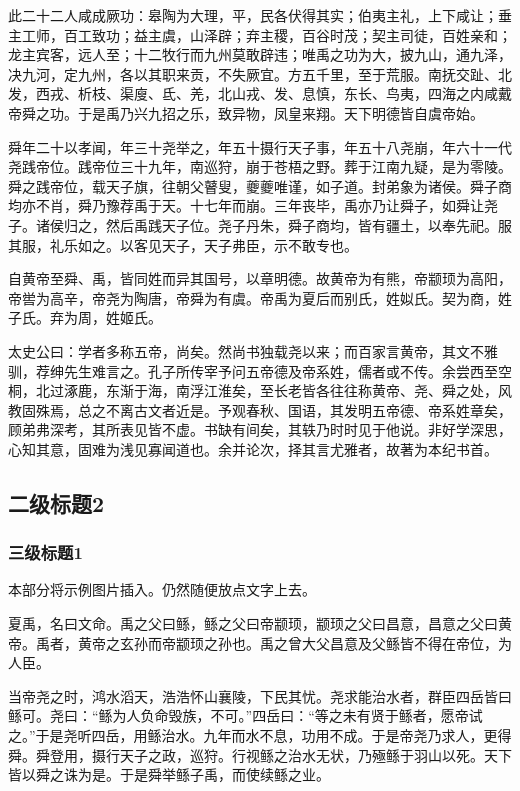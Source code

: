 \documentclass[UTF8,12pt,AutoFakeBold,fontset=fandol]{ctexart}
\begin{document}
	此二十二人咸成厥功：皋陶为大理，平，民各伏得其实；伯夷主礼，上下咸让；垂主工师，百工致功；益主虞，山泽辟；弃主稷，百谷时茂；契主司徒，百姓亲和；龙主宾客，远人至；十二牧行而九州莫敢辟违；唯禹之功为大，披九山，通九泽，决九河，定九州，各以其职来贡，不失厥宜。方五千里，至于荒服。南抚交趾、北发，西戎、析枝、渠廋、氐、羌，北山戎、发、息慎，东长、鸟夷，四海之内咸戴帝舜之功。于是禹乃兴九招之乐，致异物，凤皇来翔。天下明德皆自虞帝始。
	\par
	舜年二十以孝闻，年三十尧举之，年五十摄行天子事，年五十八尧崩，年六十一代尧践帝位。践帝位三十九年，南巡狩，崩于苍梧之野。葬于江南九疑，是为零陵。舜之践帝位，载天子旗，往朝父瞽叟，夔夔唯谨，如子道。封弟象为诸侯。舜子商均亦不肖，舜乃豫荐禹于天。十七年而崩。三年丧毕，禹亦乃让舜子，如舜让尧子。诸侯归之，然后禹践天子位。尧子丹朱，舜子商均，皆有疆土，以奉先祀。服其服，礼乐如之\cite{PhysRevLett.43.1365}。以客见天子，天子弗臣，示不敢专也。
	\par
	自黄帝至舜、禹，皆同姓而异其国号，以章明德。故黄帝为有熊，帝颛顼为高阳，帝喾为高辛，帝尧为陶唐，帝舜为有虞。帝禹为夏后而别氏，姓姒氏。契为商，姓子氏。弃为周，姓姬氏。
	\par
	太史公曰：学者多称五帝，尚矣。然尚书独载尧以来；而百家言黄帝，其文不雅驯，荐绅先生难言之。孔子所传宰予问五帝德及帝系姓，儒者或不传。余尝西至空桐，北过涿鹿，东渐于海，南浮江淮矣，至长老皆各往往称黄帝、尧、舜之处，风教固殊焉，总之不离古文者近是。予观春秋、国语，其发明五帝德、帝系姓章矣，顾弟弗深考，其所表见皆不虚。书缺有间矣，其轶乃时时见于他说。非好学深思，心知其意，固难为浅见寡闻道也。余并论次，择其言尤雅者，故著为本纪书首。
	
	
	
	
	
	\subsection{二级标题2\label{章节：二级标题2}}
	
	\subsubsection{三级标题1\label{章节：三级标题1}}
	
	本部分将示例图片插入。仍然随便放点文字上去。
	
	夏禹，名曰文命。禹之父曰鲧，鲧之父曰帝颛顼，颛顼之父曰昌意，昌意之父曰黄帝。禹者，黄帝之玄孙而帝颛顼之孙也。禹之曾大父昌意及父鲧皆不得在帝位，为人臣。
	
	当帝尧之时，鸿水滔天，浩浩怀山襄陵，下民其忧。尧求能治水者，群臣四岳皆曰鲧可。尧曰：“鲧为人负命毁族，不可。”四岳曰：“等之未有贤于鲧者，愿帝试之。”于是尧听四岳，用鲧治水。九年而水不息，功用不成。于是帝尧乃求人，更得舜。舜登用，摄行天子之政，巡狩。行视鲧之治水无状，乃殛鲧于羽山以死。天下皆以舜之诛为是。于是舜举鲧子禹，而使续鲧之业。
	
\end{document}
